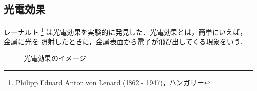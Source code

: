         \subsection{光電効果}
            レーナルト
                \footnote{
                    Philipp Eduard Anton von Lenard (1862 - 1947)，ハンガリー
                }
            は光電効果を実験的に発見した．光電効果とは，簡単にいえば，金属に光を
            照射したときに，金属表面から電子が飛び出してくる現象をいう．
                        \begin{figure}[hbt]
                            \begin{center}
                                \caption{光電効果のイメージ}
                                \label{fig:kouden_kouka_image_1}
                            \end{center}
                        \end{figure}

